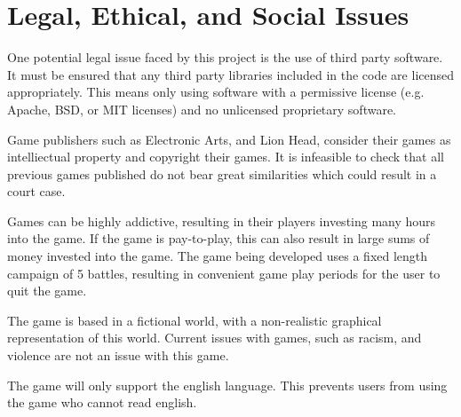 \section{Legal, Ethical, and Social Issues}
\label{section:professional_issues}

One potential legal issue faced by this project is the use of third party software.
It must be ensured that any third party libraries included in the code are licensed
appropriately. This means only using software with a permissive license (e.g. Apache, BSD, or MIT licenses) and no unlicensed proprietary software.

Game publishers such as Electronic Arts, and Lion Head, consider their games as intelliectual property and copyright their games.
It is infeasible to check that all previous games published do not bear great similarities which could result in a court case.

Games can be highly addictive, resulting in their players investing many hours into the game.
If the game is pay-to-play, this can also result in large sums of money invested into the game.
The game being developed uses a fixed length campaign of 5 battles, resulting in convenient game play periods for the user to quit the game.  

The game is based in a fictional world, with a non-realistic graphical representation of this world. Current issues with games, such as racism, and violence are not an issue with this game.

The game will only support the english language.
This prevents users from using the game who cannot read english.


